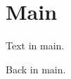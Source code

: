 \documentclass{article}
\begin{document}
\section{Main}
Text in main.

Back in main.
\end{document}
